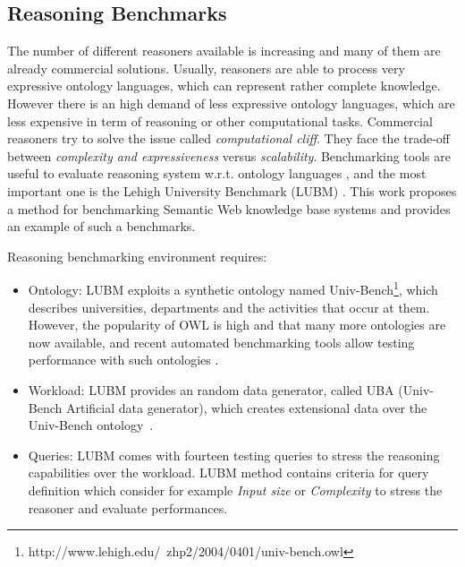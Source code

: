 \subsection{Reasoning Benchmarks}\label{sec:lubm}

The number of different reasoners available is increasing and many of them are already commercial solutions. Usually, reasoners are able to process very expressive ontology languages, which can represent rather complete knowledge. However there is an high demand of less expressive ontology languages, which are less expensive in term of reasoning or other computational tasks. Commercial reasoners try to solve the issue called \textit{computational cliff}. They face the trade-off between \textit{complexity and expressiveness} versus \textit{scalability}. Benchmarking tools are useful to evaluate reasoning system w.r.t. ontology languages \cite{bock2008benchmarking}, and the most important one is the Lehigh University Benchmark (LUBM) \cite{Guo2005}. This work proposes a  method for benchmarking Semantic Web knowledge base systems and provides an example of such a benchmarks.

Reasoning benchmarking environment requires:
\begin{itemize}
\item Ontology: LUBM exploits a synthetic ontology named Univ-Bench\footnote{http://www.lehigh.edu/~zhp2/2004/0401/univ-bench.owl}, which describes universities, departments and the activities that occur at them. However, the popularity of OWL is high and that
many more ontologies are now available, and recent automated benchmarking tools allow testing performance with such ontologies \cite{gardiner2006automated}.

\item Workload: LUBM provides an random data generator, called UBA (Univ-Bench Artificial data generator), which creates extensional data over the Univ-Bench ontology~\cite{Guo2005}.

\item Queries: LUBM comes with fourteen testing queries to stress the reasoning capabilities over the workload. LUBM method contains criteria for query definition which consider for example \textit{Input size} or \textit{Complexity} to stress the reasoner and evaluate performances.
\end{itemize}

